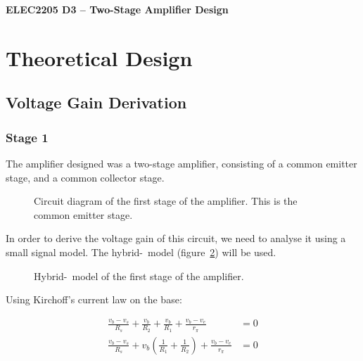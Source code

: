 \documentclass[a4paper,11pt]{article}
\begin{document}
  
\begin{center}
{\Large{\textbf{ELEC2205 D3 -- Two-Stage Amplifier Design}}} \\ [\baselineskip]

\end{center}

\begin{abstract}
\end{abstract}

\tableofcontents
\newpage

\section{Theoretical Design}
    \subsection{Voltage Gain Derivation}
        \subsubsection{Stage 1}
            The amplifier designed was a two-stage amplifier, consisting of a common emitter stage, and a common collector stage.

            \begin{figure}[h]
            \centering
                
                \caption{Circuit diagram of the first stage of the amplifier. This is the common emitter stage.}
                \label{fig:stage1}
            \end{figure}

            In order to derive the voltage gain of this circuit, we need to analyse it using a small signal model. The hybrid-\textpi\ model (figure~\ref{fig:stage1hpi}) will be used.

            \begin{figure}[h]
            \centering
                
                \caption{Hybrid-\textpi\ model of the first stage of the amplifier.}
                \label{fig:stage1hpi}
            \end{figure}

            Using Kirchoff's current law on the base:

            \begin{subequations}
            \begin{align}
                \frac{v_b - v_s}{R_s} + \frac{v_b}{R_2} + \frac{v_b}{R_1} + \frac{v_b - v_e}{r_\pi} &= 0\\
                \frac{v_b - v_s}{R_s} + v_b \left(\frac{1}{R_1} + \frac{1}{R_2} \right) + \frac{v_b - v_e}{r_\pi} &= 0 \label{eq:kclBase}
            \end{align}
            \end{subequations}
\end{document}
